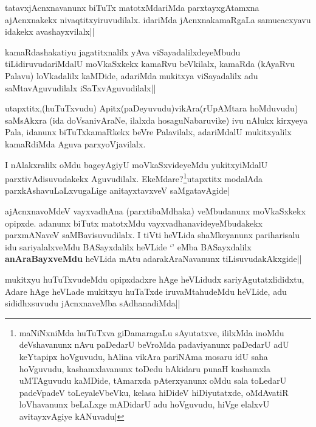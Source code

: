 \begin{artha}
tatavxjAcnxnavanunx biTuTx matotxMdariMda parxtayxgAtamxna ajAcnxnakekx nivaqtitxyiruvudilalx. idariMda jAcnxnakamaRgaLa samucacxyavu idakekx avashayxvilalx||
\end{artha}

\begin{artha}
kamaRdashakatiyu jagatitxnalilx yAva viSayadalilxdeyeMbudu tiLidiruvudariMdalU moVkaSxkekx kamaRvu beVkilalx, kamaRda (kAyaRvu Palavu) loVkadalilx kaMDide, adariMda mukitxya viSayadalilx adu saMtavAguvudilalx iSaTxvAguvudilalx||
\end{artha}


\begin{artha}
utapxtitx,(huTuTxvudu) Apitx(paDeyuvudu)vikAra(rUpAMtara hoMduvudu) saMsAkxra (ida doVsanivAraNe, ilalxda hosaguNabaruvike) ivu nAlukx kirxyeya Pala, idanunx biTuTxkamaRkekx beVre Palavilalx, adariMdalU mukitxyalilx kamaRdiMda Aguva parxyoVjavilalx.
\end{artha}

\begin{artha}
I nAlakxralilx oMdu bageyAgiyU moVkaSxvideyeMdu yukitxyiMdalU parxtivAdisuvudakekx Aguvudilalx. EkeMdare?\footnote{maNiNxniMda huTuTxva giDamaragaLu sAyutatxve, ililxMda inoMdu deVshavanunx nAvu paDedarU beVroMda padaviyanunx paDedarU adU keYtapipx hoVguvudu, hAlina vikAra pariNAma mosaru idU saha hoVguvudu, kashamxlavanunx toDedu hAkidaru punaH kashamxla uMTAguvudu kaMDide, tAmarxda pAterxyanunx oMdu sala toLedarU padeVpadeV toLeyaleVbeVku, kelasa hiDideV hiDiyutatxde, oMdAvatiR loVhavanunx beLaLxge mADidarU adu hoVguvudu, hiVge elalxvU avitayxvAgiye kANuvadu|}utapxtitx modalAda parxkAshavuLaLxvugaLige anitayxtavxveV saMgatavAgide|
\end{artha}

\begin{artha}
ajAcnxnavoMdeV vayxvadhAna (parxtibaMdhaka) veMbudanunx moVkaSxkekx opipxde. adanunx biTutx matotxMdu vayxvadhanavideyeMbudakekx parxmANaveV saMBavisuvudilalx. I tiVti heVLida shaMkeyanunx pariharisalu idu sariyalalxveMdu BASayxdalilx heVLide `\stext' eMba BASayxdalilx \textbf{anAraBayxveMdu} heVLida mAtu adarakAraNavanunx tiLisuvudakAkxgide||
\end{artha}


\begin{artha}
mukitxyu huTuTxvudeMdu opipxdadxre hAge heVLidudx sariyAgutatxlididxtu, Adare hAge heVLade mukitxyu huTaTxde iruvaMtahudeMdu heVLide, adu sididhxsuvudu jAcnxnaveMba sAdhanadiMda||
\end{artha}

